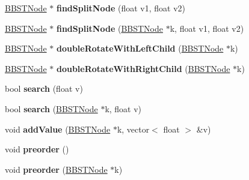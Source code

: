 \begin{DoxyCompactItemize}
\item 
\hypertarget{class_b_b_s_t_a3350d6d2e2579d013d07a6572d9ced82}{}\hyperlink{class_b_b_s_t_node}{B\+B\+S\+T\+Node} $\ast$ {\bfseries find\+Split\+Node} (float v1, float v2)\label{class_b_b_s_t_a3350d6d2e2579d013d07a6572d9ced82}

\item 
\hypertarget{class_b_b_s_t_ab205fcbab2674b083b9ead3f7092a2f1}{}\hyperlink{class_b_b_s_t_node}{B\+B\+S\+T\+Node} $\ast$ {\bfseries find\+Split\+Node} (\hyperlink{class_b_b_s_t_node}{B\+B\+S\+T\+Node} $\ast$k, float v1, float v2)\label{class_b_b_s_t_ab205fcbab2674b083b9ead3f7092a2f1}

\item 
\hypertarget{class_b_b_s_t_a36a019572a4631a22f2f85e5ef2638cc}{}\hyperlink{class_b_b_s_t_node}{B\+B\+S\+T\+Node} $\ast$ {\bfseries double\+Rotate\+With\+Left\+Child} (\hyperlink{class_b_b_s_t_node}{B\+B\+S\+T\+Node} $\ast$k)\label{class_b_b_s_t_a36a019572a4631a22f2f85e5ef2638cc}

\item 
\hypertarget{class_b_b_s_t_ad643769a0d29b01b17cf28cc8d7203f2}{}\hyperlink{class_b_b_s_t_node}{B\+B\+S\+T\+Node} $\ast$ {\bfseries double\+Rotate\+With\+Right\+Child} (\hyperlink{class_b_b_s_t_node}{B\+B\+S\+T\+Node} $\ast$k)\label{class_b_b_s_t_ad643769a0d29b01b17cf28cc8d7203f2}

\item 
\hypertarget{class_b_b_s_t_a34ed84c4a63b9594d828ad0a5bb94dd8}{}bool {\bfseries search} (float v)\label{class_b_b_s_t_a34ed84c4a63b9594d828ad0a5bb94dd8}

\item 
\hypertarget{class_b_b_s_t_ab1e9045b892b76a1007af822d91c2d5e}{}bool {\bfseries search} (\hyperlink{class_b_b_s_t_node}{B\+B\+S\+T\+Node} $\ast$k, float v)\label{class_b_b_s_t_ab1e9045b892b76a1007af822d91c2d5e}

\item 
\hypertarget{class_b_b_s_t_a55de74e69a5dc5ac438678bc9a137a4e}{}void {\bfseries add\+Value} (\hyperlink{class_b_b_s_t_node}{B\+B\+S\+T\+Node} $\ast$k, vector$<$ float $>$ \&v)\label{class_b_b_s_t_a55de74e69a5dc5ac438678bc9a137a4e}

\item 
\hypertarget{class_b_b_s_t_ab7d4bc8c28dffd6e71311295621a94ef}{}void {\bfseries preorder} ()\label{class_b_b_s_t_ab7d4bc8c28dffd6e71311295621a94ef}

\item 
\hypertarget{class_b_b_s_t_a9804a78f6bdc69fd0f9a016e68927cb5}{}void {\bfseries preorder} (\hyperlink{class_b_b_s_t_node}{B\+B\+S\+T\+Node} $\ast$k)\label{class_b_b_s_t_a9804a78f6bdc69fd0f9a016e68927cb5}


\end{DoxyCompactItemize}

